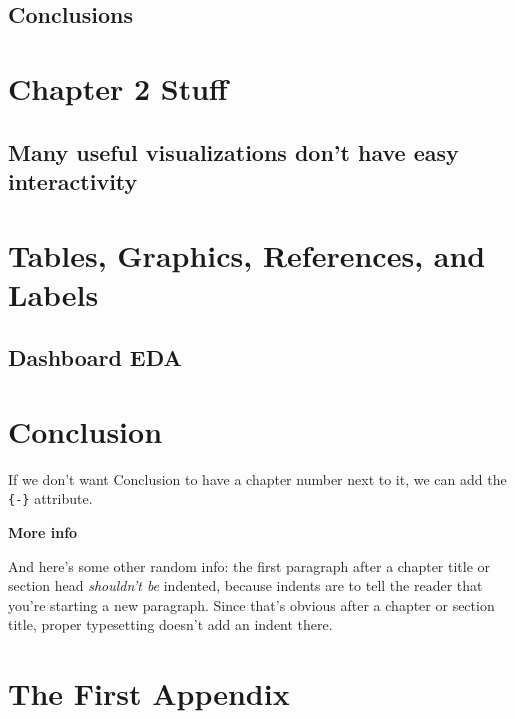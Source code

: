 \documentclass[print]{nuthesis}
\begin{document}
\hypertarget{conclusions}{%
\section{Conclusions}\label{conclusions}}

\hypertarget{math-sci}{%
\chapter{Chapter 2 Stuff}\label{math-sci}}

\hypertarget{many-useful-visualizations-dont-have-easy-interactivity}{%
\section{Many useful visualizations don't have easy interactivity}\label{many-useful-visualizations-dont-have-easy-interactivity}}

\hypertarget{ref-labels}{%
\chapter{Tables, Graphics, References, and Labels}\label{ref-labels}}

\hypertarget{dashboard-eda}{%
\section{Dashboard EDA}\label{dashboard-eda}}

\hypertarget{conclusion-1}{%
\chapter*{Conclusion}\label{conclusion-1}}

If we don't want Conclusion to have a chapter number next to it, we can add the \texttt{\{-\}} attribute.

\textbf{More info}

And here's some other random info: the first paragraph after a chapter title or section head \emph{shouldn't be} indented, because indents are to tell the reader that you're starting a new paragraph. Since that's obvious after a chapter or section title, proper typesetting doesn't add an indent there.

\appendix

\hypertarget{the-first-appendix}{%
\chapter{The First Appendix}\label{the-first-appendix}}
\end{document}
